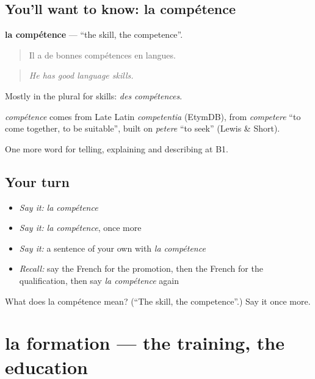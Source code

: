 \subsection*{You'll want to know: la compétence}
\textbf{la compétence} — \textquotedblleft{}the skill, the competence\textquotedblright{}.

\begin{quote}
Il a de bonnes compétences en langues.
\end{quote}

\begin{quote}
\emph{He has good language skills.}
\end{quote}

Mostly in the plural for skills: \emph{des compétences}.

\begin{cousinweb}
\emph{compétence} comes from Late Latin \emph{competentia} (EtymDB), from \emph{competere} \textquotedblleft{}to come together, to be suitable\textquotedblright{}, built on \emph{petere} \textquotedblleft{}to seek\textquotedblright{} (Lewis \& Short).
\end{cousinweb}

\begin{grammarlens}[title={What you've built}]
One more word for telling, explaining and describing at B1.
\end{grammarlens}

\subsection*{Your turn}
\begin{itemize}
\raggedright
  \item \emph{Say it:} \emph{la compétence}
  \item \emph{Say it:} \emph{la compétence}, once more
  \item \emph{Say it:} a sentence of your own with \emph{la compétence}
  \item \emph{Recall:} say the French for the promotion, then the French for the qualification, then say \emph{la compétence} again
\end{itemize}

\begin{tcolorbox}[breakable,colback=teal!4,colframe=teal!35!black,title={Before you move on}]
What does la compétence mean? (\textquotedblleft{}The skill, the competence\textquotedblright{}.) Say it once more.
\end{tcolorbox}
\section[la formation]{la formation — the training, the education}


